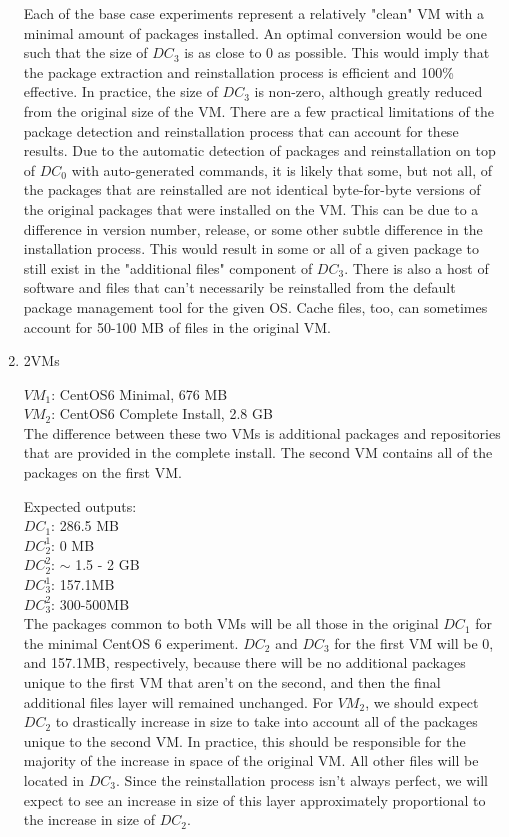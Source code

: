 \begin{enumerate}
Each of the base case experiments represent a relatively "clean" VM with a minimal amount of packages installed. An optimal conversion would be one such that the size of $DC_3$ is as close to 0 as possible. This would imply that the package extraction and reinstallation process is efficient and 100\% effective. In practice, the size of $DC_3$ is non-zero, although greatly reduced from the original size of the VM. There are a few practical limitations of the package detection and reinstallation process that can account for these results. Due to the automatic detection of packages and reinstallation on top of $DC_0$ with auto-generated commands, it is likely that some, but not all, of the packages that are reinstalled are not identical byte-for-byte versions of the original packages that were installed on the VM. This can be due to a difference in version number, release, or some other subtle difference in the installation process. This would result in some or all of a given package to still exist in the "additional files" component of $DC_3$. There is also a host of software and files that can't necessarily be reinstalled from the default package management tool for the given OS. Cache files, too, can sometimes account for 50-100 MB of files in the original VM.

\item 2VMs

$VM_1$: CentOS6 Minimal, 676 MB\\
$VM_2$: CentOS6 Complete Install, 2.8 GB\\

The difference between these two VMs is additional packages and repositories that are provided in the complete install. The second VM contains all of the packages on the first VM.

Expected outputs:\\

$DC_1$: 286.5 MB\\
$DC_2^1$: 0 MB\\
$DC_2^2$: $\sim$ 1.5 - 2 GB\\
$DC_3^1$: 157.1MB\\
$DC_3^2$: 300-500MB\\

The packages common to both VMs will be all those in the original $DC_1$ for the minimal CentOS 6 experiment. $DC_2$ and $DC_3$ for the first VM will be 0, and 157.1MB, respectively, because there will be no additional packages unique to the first VM that aren't on the second, and then the final additional files layer will remained unchanged. For $VM_2$, we should expect $DC_2$ to drastically increase in size to take into account all of the packages unique to the second VM. In practice, this should be responsible for the majority of the increase in space of the original VM. All other files will be located in $DC_3$. Since the reinstallation process isn't always perfect, we will expect to see an increase in size of this layer approximately proportional to the increase in size of $DC_2$.


\end{enumerate}
